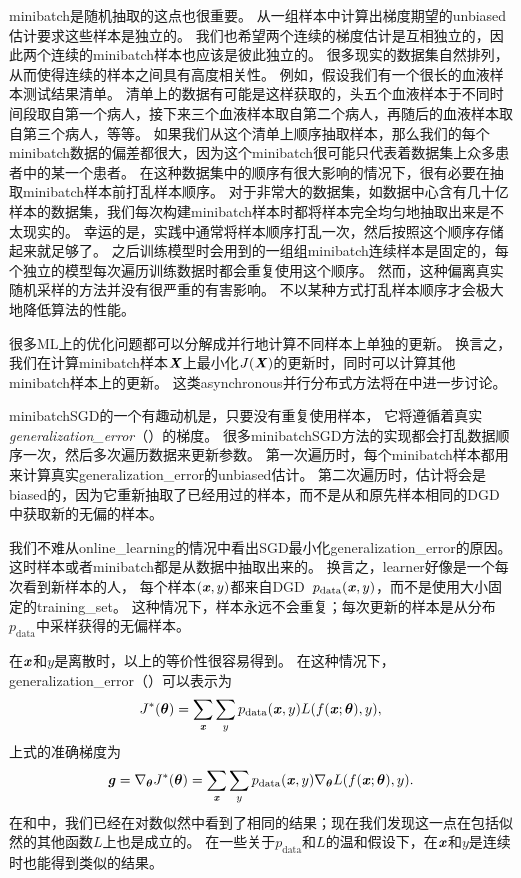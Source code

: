 \gls{minibatch}是随机抽取的这点也很重要。
从一组样本中计算出梯度期望的\gls{unbiased}估计要求这些样本是独立的。
我们也希望两个连续的梯度估计是互相独立的，因此两个连续的\gls{minibatch}样本也应该是彼此独立的。
很多现实的数据集自然排列，从而使得连续的样本之间具有高度相关性。
例如，假设我们有一个很长的血液样本测试结果清单。
清单上的数据有可能是这样获取的，头五个血液样本于不同时间段取自第一个病人，接下来三个血液样本取自第二个病人，再随后的血液样本取自第三个病人，等等。
如果我们从这个清单上顺序抽取样本，那么我们的每个\gls{minibatch}数据的偏差都很大，因为这个\gls{minibatch}很可能只代表着数据集上众多患者中的某一个患者。
在这种数据集中的顺序有很大影响的情况下，很有必要在抽取\gls{minibatch}样本前打乱样本顺序。
对于非常大的数据集，如数据中心含有几十亿样本的数据集，我们每次构建\gls{minibatch}样本时都将样本完全均匀地抽取出来是不太现实的。
幸运的是，实践中通常将样本顺序打乱一次，然后按照这个顺序存储起来就足够了。
之后训练模型时会用到的一组组\gls{minibatch}连续样本是固定的，每个独立的模型每次遍历训练数据时都会重复使用这个顺序。
然而，这种偏离真实随机采样的方法并没有很严重的有害影响。
不以某种方式打乱样本顺序才会极大地降低算法的性能。


很多\gls{ML}上的优化问题都可以分解成并行地计算不同样本上单独的更新。
换言之，我们在计算\gls{minibatch}样本$\boldsymbol{\mathit{X}}$上最小化$J(\boldsymbol{\mathit{X}})$的更新时，同时可以计算其他\gls{minibatch}样本上的更新。
这类\gls{asynchronous}并行分布式方法将在中进一步讨论。


\gls{minibatch}\gls{SGD}的一个有趣动机是，只要没有重复使用样本，
它将遵循着真实\emph{\gls{generalization_error}}（）的梯度。
很多\gls{minibatch}\gls{SGD}方法的实现都会打乱数据顺序一次，然后多次遍历数据来更新参数。
第一次遍历时，每个\gls{minibatch}样本都用来计算真实\gls{generalization_error}的\gls{unbiased}估计。
第二次遍历时，估计将会是\gls{biased}的，因为它重新抽取了已经用过的样本，而不是从和原先样本相同的\gls{DGD}中获取新的无偏的样本。


我们不难从\gls{online_learning}的情况中看出\gls{SGD}最小化\gls{generalization_error}的原因。
这时样本或者\gls{minibatch}都是从数据中抽取出来的。
换言之，\gls{learner}好像是一个每次看到新样本的人，
每个样本$(\boldsymbol{\mathit{x}},y)$都来自\gls{DGD}~$p_{\text{data}}(\boldsymbol{\mathit{x}},y)$，而不是使用大小固定的\gls{training_set}。
这种情况下，样本永远不会重复；每次更新的样本是从分布$p_\text{data}$中采样获得的无偏样本。


在$\boldsymbol{\mathit{x}}$和$y$是离散时，以上的等价性很容易得到。
在这种情况下，\gls{generalization_error}（）可以表示为
\begin{equation}
\label{eq:8.7}
    J^*(\boldsymbol{\theta}) = \sum_{\boldsymbol{\mathit{x}}} \sum_y p_{\text{data}}(\boldsymbol{\mathit{x}}, y) L(f(\boldsymbol{\mathit{x}}; \boldsymbol{\theta}),y),
\end{equation}
上式的准确梯度为
\begin{equation}
\label{eq:8.8}
    \boldsymbol{\mathit{g}} = \nabla_{\boldsymbol{\theta}} J^*(\boldsymbol{\theta}) = \sum_{\boldsymbol{\mathit{x}}} \sum_y p_{\text{data}}
    (\boldsymbol{\mathit{x}}, y) \nabla_{\boldsymbol{\theta}} L(f(\boldsymbol{\mathit{x}};\boldsymbol{\theta}),y) .
\end{equation}
在和中，我们已经在对数似然中看到了相同的结果；现在我们发现这一点在包括似然的其他函数$L$上也是成立的。
在一些关于$p_\text{data}$和$L$的温和假设下，在$\boldsymbol{\mathit{x}}$和$y$是连续时也能得到类似的结果。


